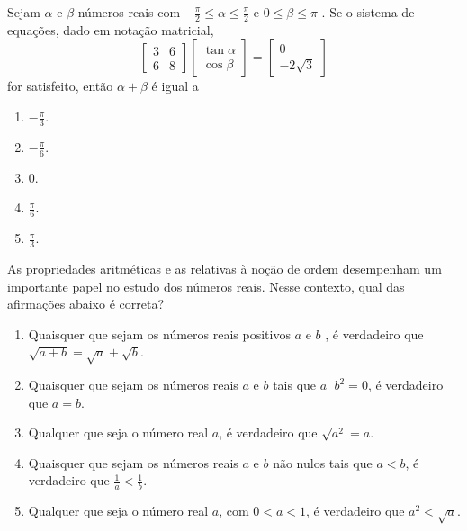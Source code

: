 \documentclass[oneside,a4paper]{amsart}
\begin{document}
\begin{questao} 
  Sejam $\alpha$ e $\beta$ números reais com
  $-\frac{\pi}{2}\leq\alpha\leq\frac{\pi}{2}$ e $0\leq\beta\leq\pi$ . Se o
  sistema de equações, dado em notação matricial, \[
  \begin{bmatrix}
    3&6\\
    6&8
  \end{bmatrix}
  \begin{bmatrix}
    \tan\alpha\\\cos\beta
  \end{bmatrix} =
  \begin{bmatrix}
    0\\-2\sqrt{3}
  \end{bmatrix}\] for satisfeito, então $\alpha+\beta$ é igual a

  \begin{enumerate}[\bf a.]
    \item $-\frac{\pi}{3}$.
    \item $-\frac{\pi}{6}$. %
    \item $0$.
    \item $\frac{\pi}{6}$.
    \item $\frac{\pi}{3}$.
  \end{enumerate}
\end{questao}

\begin{questao}
  As propriedades aritméticas e as relativas à noção de ordem
  desempenham um importante papel no estudo dos números reais. Nesse
  contexto, qual das afirmações abaixo é correta?
  \begin{enumerate}[\bf a.]
    \item Quaisquer que sejam os números reais positivos $a$ e $b$
     , é verdadeiro que $\sqrt{a+b}=\sqrt{a}+\sqrt{b}$.
     \item Quaisquer que sejam os números reais $a$ e $b$ tais que
     $a^-b^2=0$, é verdadeiro que $a=b$.
     \item Qualquer que seja o número real $a$, é verdadeiro que
     $\sqrt{a^2}=a$.
     \item Quaisquer que sejam os números reais $a$ e $b$ não
     nulos tais que $a<b$, é verdadeiro que $\frac{1}{a}<\frac{1}{b}$.
     \item Qualquer que seja o número real $a$, com $0<a<1$, é
     verdadeiro que $a^2<\sqrt{a}$. %
  \end{enumerate}
\end{questao}
\end{document}
